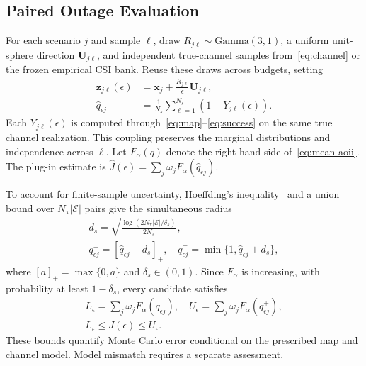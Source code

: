 \subsection{Paired Outage Evaluation}
For each scenario $j$ and sample $\ell$, draw $R_{j\ell}\sim\mathrm{Gamma}(3,1)$, a uniform unit-sphere direction $\mathbf U_{j\ell}$, and independent true-channel samples from~\eqref{eq:channel} or the frozen empirical CSI bank. Reuse these draws across budgets, setting
\begin{align}
 \mathbf z_{j\ell}(\epsilon)
 &=\mathbf x_j+\frac{R_{j\ell}}{\epsilon}\mathbf U_{j\ell},\nonumber\\
 \widehat q_{\epsilon j}
 &=\frac1{N_s}\sum_{\ell=1}^{N_s}(1-Y_{j\ell}(\epsilon)).
 \label{eq:paired-outage}
\end{align}
Each $Y_{j\ell}(\epsilon)$ is computed through~\eqref{eq:map}--\eqref{eq:success} on the same true channel realization. This coupling preserves the marginal distributions and independence across $\ell$. Let $F_\alpha(q)$ denote the right-hand side of~\eqref{eq:mean-aoii}. The plug-in estimate is $\widehat J(\epsilon)=\sum_j\omega_jF_\alpha(\widehat q_{\epsilon j})$.

To account for finite-sample uncertainty, Hoeffding's inequality~\cite{hoeffding1963} and a union bound over $N_{\mathrm x}|\mathcal E|$ pairs give the simultaneous radius
\begin{equation}
 \begin{gathered}
 d_s=\sqrt{\frac{\log(2N_{\mathrm x}|\mathcal E|/\delta_s)}{2N_s}},\\
 q^-_{\epsilon j}=[\widehat q_{\epsilon j}-d_s]_+,\quad
 q^+_{\epsilon j}=\min\{1,\widehat q_{\epsilon j}+d_s\},
 \end{gathered}
 \label{eq:outage-confidence}
\end{equation}
where $[a]_+=\max\{0,a\}$ and $\delta_s\in(0,1)$. Since $F_\alpha$ is increasing, with probability at least $1-\delta_s$, every candidate satisfies
\begin{equation}
 \begin{gathered}
 L_\epsilon=\sum_j\omega_jF_\alpha(q^-_{\epsilon j}),\quad
 U_\epsilon=\sum_j\omega_jF_\alpha(q^+_{\epsilon j}),\\
 L_\epsilon\le J(\epsilon)\le U_\epsilon.
 \end{gathered}
 \label{eq:aoii-confidence}
\end{equation}
These bounds quantify Monte Carlo error conditional on the prescribed map and channel model. Model mismatch requires a separate assessment.

